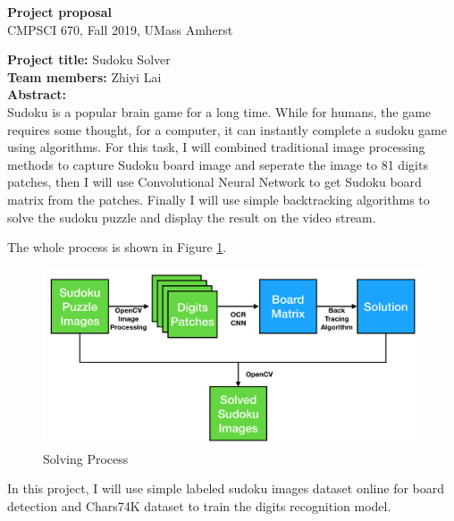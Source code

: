 \documentclass{report}
\begin{document}
\begin{titlepage}
\begin{center}
\large{\bfseries Project proposal}\\
\large{CMPSCI 670, Fall 2019, UMass Amherst}
\end{center}
\textbf{Project title:} Sudoku Solver\\
\newline
\textbf{Team members:} Zhiyi Lai\\
\newline
\textbf{Abstract:}\\

Sudoku is a popular brain game for a long time. While for humans, the game requires some thought, for a computer, it can instantly complete a sudoku game using algorithms.
For this task, I will combined traditional image processing methods to capture Sudoku board image and seperate the image to 81 digits patches, then I will use Convolutional Neural Network to get Sudoku board matrix from the patches.
Finally I will use simple backtracking algorithms to solve the sudoku puzzle and display the result on the video stream.

The whole process is shown in Figure \ref{fig:process}.

\begin{figure}[H]
    \centering
    \includegraphics[scale=0.4]{processing.png}
    \caption{Solving Process}
    \label{fig:process}
\end{figure}

In this project, I will use simple labeled sudoku images dataset online for board detection and Chars74K dataset to train the digits recognition model.

\end{titlepage}
\end{document}
